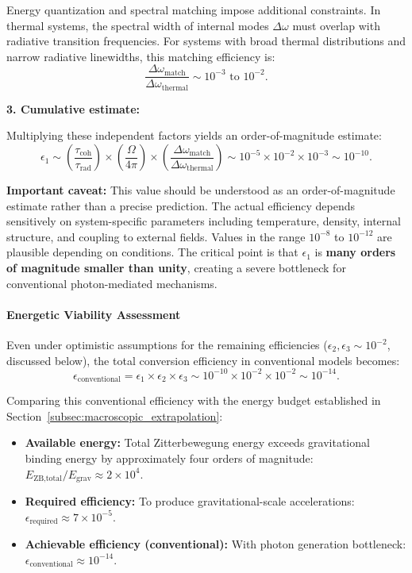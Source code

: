 \documentclass[12pt,letterpaper]{article}
\begin{document}
Energy quantization and spectral matching impose additional constraints. In thermal systems, the spectral width of internal modes $\Delta\omega$ must overlap with radiative transition frequencies. For systems with broad thermal distributions and narrow radiative linewidths, this matching efficiency is:
\begin{equation}
\frac{\Delta\omega_{\text{match}}}{\Delta\omega_{\text{thermal}}} \sim 10^{-3} \text{ to } 10^{-2}.
\end{equation}

\textbf{3. Cumulative estimate:}

Multiplying these independent factors yields an order-of-magnitude estimate:
\begin{equation}
\epsilon_1 \sim \left(\frac{\tau_{\text{coh}}}{\tau_{\text{rad}}}\right) \times \left(\frac{\Omega}{4\pi}\right) \times \left(\frac{\Delta\omega_{\text{match}}}{\Delta\omega_{\text{thermal}}}\right) \sim 10^{-5} \times 10^{-2} \times 10^{-3} \sim 10^{-10}.
\end{equation}

\textbf{Important caveat:} This value should be understood as an order-of-magnitude estimate rather than a precise prediction. The actual efficiency depends sensitively on system-specific parameters including temperature, density, internal structure, and coupling to external fields. Values in the range $10^{-8}$ to $10^{-12}$ are plausible depending on conditions. The critical point is that $\epsilon_1$ is \textbf{many orders of magnitude smaller than unity}, creating a severe bottleneck for conventional photon-mediated mechanisms.

\paragraph{Energetic Viability Assessment}

Even under optimistic assumptions for the remaining efficiencies ($\epsilon_2, \epsilon_3 \sim 10^{-2}$, discussed below), the total conversion efficiency in conventional models becomes:
\begin{equation}
\epsilon_{\text{conventional}} = \epsilon_1 \times \epsilon_2 \times \epsilon_3 \sim 10^{-10} \times 10^{-2} \times 10^{-2} \sim 10^{-14}.
\end{equation}

Comparing this conventional efficiency with the energy budget established in Section~\ref{subsec:macroscopic_extrapolation}:

\begin{itemize}
\item \textbf{Available energy:} Total Zitterbewegung energy exceeds gravitational binding energy by approximately four orders of magnitude: $E_{\text{ZB,total}}/E_{\text{grav}} \approx 2 \times 10^4$.
\item \textbf{Required efficiency:} To produce gravitational-scale accelerations: $\epsilon_{\text{required}} \approx 7 \times 10^{-5}$.
\item \textbf{Achievable efficiency (conventional):} With photon generation bottleneck: $\epsilon_{\text{conventional}} \approx 10^{-14}$.
\end{itemize}
\end{document}
